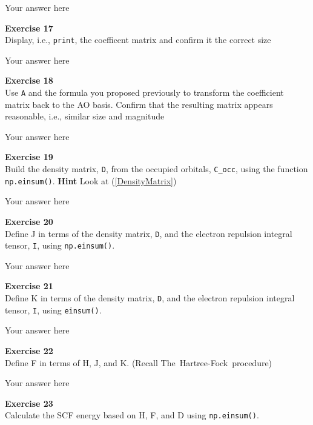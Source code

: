 \documentclass{article}
\begin{document}
Your answer here

\begin{mdframed}
\textbf{Exercise 17}\\
Display, i.e., \texttt{print}, the coefficent matrix and confirm it the correct size
\end{mdframed}

Your answer here

\begin{mdframed}
\textbf{Exercise 18}\\
Use \texttt{A} and the formula you proposed previously to transform the coefficient matrix back to the AO basis. Confirm that the resulting matrix appears reasonable, i.e., similar size and magnitude
\end{mdframed}

Your answer here

\begin{mdframed}
\textbf{Exercise 19}\\
Build the density matrix, \texttt{D}, from the occupied orbitals, \texttt{C\_occ}, using the function \texttt{np.einsum()}. \textbf{Hint} Look at (\ref{DensityMatrix})
\end{mdframed}

Your answer here

\begin{mdframed}
\textbf{Exercise 20}\\
Define J  in terms of the density matrix, \texttt{D}, and the electron repulsion integral tensor, \texttt{I}, using \texttt{np.einsum()}.
\end{mdframed}

Your answer here

\begin{mdframed}
\textbf{Exercise 21}\\
Define K  in terms of the density matrix, \texttt{D}, and the electron repulsion integral tensor, \texttt{I}, using \texttt{einsum()}.
\end{mdframed}

Your answer here

\begin{mdframed}
\textbf{Exercise 22}\\
Define F in terms of H, J, and K. (Recall The~Hartree-Fock~procedure)
\end{mdframed}

Your answer here

\begin{mdframed}
\textbf{Exercise 23}\\
Calculate the SCF energy based on H, F, and D using \texttt{np.einsum()}.
\end{mdframed}
\end{document}
